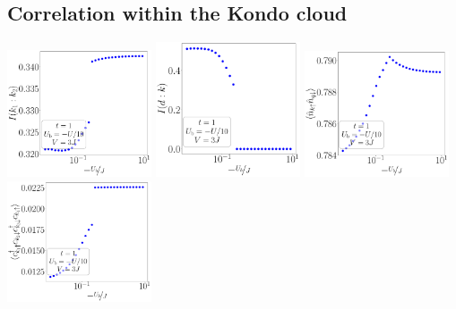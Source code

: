 \documentclass[10pt]{report}
\numberwithin{equation}{section}
\begin{document}
\subsection*{Correlation within the Kondo cloud}
\begin{center}
	\includegraphics[width=0.32\textwidth]{../figures/corr-k-t=1.000,J=10.000,0.000,30,V=3J,Ubath=-U_by_10,N=6,U=1.000,889.513,30.pdf}
	\includegraphics[width=0.32\textwidth]{../figures/mi-dk-t=1.000,J=10.000,0.000,30,V=3J,Ubath=-U_by_10,N=6,U=1.000,889.513,30.pdf}
	\includegraphics[width=0.32\textwidth]{../figures/corr-k-diag-t=1.000,J=10.000,0.000,30,V=3J,Ubath=-U_by_10,N=6,U=1.000,889.513,30.pdf}
	\includegraphics[width=0.32\textwidth]{../figures/corr-k-od-t=1.000,J=10.000,0.000,30,V=3J,Ubath=-U_by_10,N=6,U=1.000,889.513,30.pdf}
\end{center}
\end{document}

